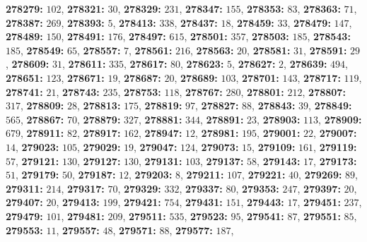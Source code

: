 \textsf{\bfseries 278279:} $102$, \textsf{\bfseries 278321:} $30$, \textsf{\bfseries 278329:} $231$, \textsf{\bfseries 278347:} $155$, \textsf{\bfseries 278353:} $83$, \textsf{\bfseries 278363:} $71$, \textsf{\bfseries 278387:} $269$, \textsf{\bfseries 278393:} $5$, \textsf{\bfseries 278413:} $338$, \textsf{\bfseries 278437:} $18$, \textsf{\bfseries 278459:} $33$, \textsf{\bfseries 278479:} $147$, \textsf{\bfseries 278489:} $150$, \textsf{\bfseries 278491:} $176$, \textsf{\bfseries 278497:} $615$, \textsf{\bfseries 278501:} $357$, \textsf{\bfseries 278503:} $185$, \textsf{\bfseries 278543:} $185$, \textsf{\bfseries 278549:} $65$, \textsf{\bfseries 278557:} $7$, \textsf{\bfseries 278561:} $216$, \textsf{\bfseries 278563:} $20$, \textsf{\bfseries 278581:} $31$, \textsf{\bfseries 278591:} $29$, \textsf{\bfseries 278609:} $31$, \textsf{\bfseries 278611:} $335$, \textsf{\bfseries 278617:} $80$, \textsf{\bfseries 278623:} $5$, \textsf{\bfseries 278627:} $2$, \textsf{\bfseries 278639:} $494$, \textsf{\bfseries 278651:} $123$, \textsf{\bfseries 278671:} $19$, \textsf{\bfseries 278687:} $20$, \textsf{\bfseries 278689:} $103$, \textsf{\bfseries 278701:} $143$, \textsf{\bfseries 278717:} $119$, \textsf{\bfseries 278741:} $21$, \textsf{\bfseries 278743:} $235$, \textsf{\bfseries 278753:} $118$, \textsf{\bfseries 278767:} $280$, \textsf{\bfseries 278801:} $212$, \textsf{\bfseries 278807:} $317$, \textsf{\bfseries 278809:} $28$, \textsf{\bfseries 278813:} $175$, \textsf{\bfseries 278819:} $97$, \textsf{\bfseries 278827:} $88$, \textsf{\bfseries 278843:} $39$, \textsf{\bfseries 278849:} $565$, \textsf{\bfseries 278867:} $70$, \textsf{\bfseries 278879:} $327$, \textsf{\bfseries 278881:} $344$, \textsf{\bfseries 278891:} $23$, \textsf{\bfseries 278903:} $113$, \textsf{\bfseries 278909:} $679$, \textsf{\bfseries 278911:} $82$, \textsf{\bfseries 278917:} $162$, \textsf{\bfseries 278947:} $12$, \textsf{\bfseries 278981:} $195$, \textsf{\bfseries 279001:} $22$, \textsf{\bfseries 279007:} $14$, \textsf{\bfseries 279023:} $105$, \textsf{\bfseries 279029:} $19$, \textsf{\bfseries 279047:} $124$, \textsf{\bfseries 279073:} $15$, \textsf{\bfseries 279109:} $161$, \textsf{\bfseries 279119:} $57$, \textsf{\bfseries 279121:} $130$, \textsf{\bfseries 279127:} $130$, \textsf{\bfseries 279131:} $103$, \textsf{\bfseries 279137:} $58$, \textsf{\bfseries 279143:} $17$, \textsf{\bfseries 279173:} $51$, \textsf{\bfseries 279179:} $50$, \textsf{\bfseries 279187:} $12$, \textsf{\bfseries 279203:} $8$, \textsf{\bfseries 279211:} $107$, \textsf{\bfseries 279221:} $40$, \textsf{\bfseries 279269:} $89$, \textsf{\bfseries 279311:} $214$, \textsf{\bfseries 279317:} $70$, \textsf{\bfseries 279329:} $332$, \textsf{\bfseries 279337:} $80$, \textsf{\bfseries 279353:} $247$, \textsf{\bfseries 279397:} $20$, \textsf{\bfseries 279407:} $20$, \textsf{\bfseries 279413:} $199$, \textsf{\bfseries 279421:} $754$, \textsf{\bfseries 279431:} $151$, \textsf{\bfseries 279443:} $17$, \textsf{\bfseries 279451:} $237$, \textsf{\bfseries 279479:} $101$, \textsf{\bfseries 279481:} $209$, \textsf{\bfseries 279511:} $535$, \textsf{\bfseries 279523:} $95$, \textsf{\bfseries 279541:} $87$, \textsf{\bfseries 279551:} $85$, \textsf{\bfseries 279553:} $11$, \textsf{\bfseries 279557:} $48$, \textsf{\bfseries 279571:} $88$, \textsf{\bfseries 279577:} $187$, 
